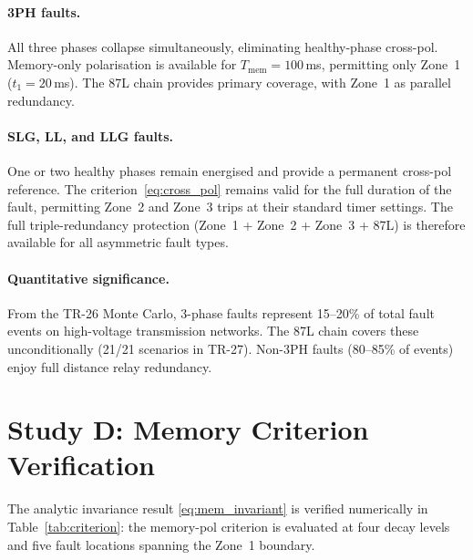 \documentclass[11pt,a4paper]{article}
\begin{document}
\paragraph{3PH faults.}
All three phases collapse simultaneously, eliminating healthy-phase cross-pol.
Memory-only polarisation is available for $T_\mathrm{mem}=100$\,ms, permitting
only Zone~1 ($t_1=20$\,ms).  The 87L chain provides primary coverage, with
Zone~1 as parallel redundancy.

\paragraph{SLG, LL, and LLG faults.}
One or two healthy phases remain energised and provide a permanent cross-pol
reference.  The criterion~\eqref{eq:cross_pol} remains valid for the full
duration of the fault, permitting Zone~2 and Zone~3 trips at their standard
timer settings.  The full triple-redundancy protection (Zone~1 + Zone~2 +
Zone~3 + 87L) is therefore available for all asymmetric fault types.

\paragraph{Quantitative significance.}
From the TR-26 Monte Carlo, 3-phase faults represent 15--20\% of total fault
events on high-voltage transmission networks.  The 87L chain covers these
unconditionally (21/21 scenarios in TR-27).  Non-3PH faults (80--85\% of events)
enjoy full distance relay redundancy.

\section{Study D: Memory Criterion Verification}
\label{sec:criterion_verify}

The analytic invariance result \eqref{eq:mem_invariant} is verified numerically
in Table~\ref{tab:criterion}: the memory-pol criterion is evaluated at four decay
levels and five fault locations spanning the Zone~1 boundary.
\end{document}
